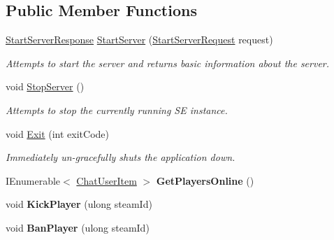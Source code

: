 \subsection*{Public Member Functions}
\begin{DoxyCompactItemize}
\item 
\hyperlink{class_s_e_comm_1_1_start_server_response}{Start\+Server\+Response} \hyperlink{interface_s_e_comm_1_1_i_server_service_a2df8b69afdb995c1d2ad7b5a39f59feb}{Start\+Server} (\hyperlink{class_s_e_comm_1_1_start_server_request}{Start\+Server\+Request} request)
\begin{DoxyCompactList}\small\item\em Attempts to start the server and returns basic information about the server. \end{DoxyCompactList}\item 
void \hyperlink{interface_s_e_comm_1_1_i_server_service_af0faa9bdfebe1514e6dec2a5d54aca94}{Stop\+Server} ()
\begin{DoxyCompactList}\small\item\em Attempts to stop the currently running S\+E instance. \end{DoxyCompactList}\item 
void \hyperlink{interface_s_e_comm_1_1_i_server_service_a3ac39f5e58c50a4c4bc92b576774f749}{Exit} (int exit\+Code)
\begin{DoxyCompactList}\small\item\em Immediately un-\/gracefully shuts the application down. \end{DoxyCompactList}\item 
\hypertarget{interface_s_e_comm_1_1_i_server_service_a1d0873cf58e433ee8434898cf92659bb}{}I\+Enumerable$<$ \hyperlink{class_s_e_mod_a_p_i_internal_1_1_chat_user_item}{Chat\+User\+Item} $>$ {\bfseries Get\+Players\+Online} ()\label{interface_s_e_comm_1_1_i_server_service_a1d0873cf58e433ee8434898cf92659bb}

\item 
\hypertarget{interface_s_e_comm_1_1_i_server_service_a8095aceeea7e5f7af615a6b033765648}{}void {\bfseries Kick\+Player} (ulong steam\+Id)\label{interface_s_e_comm_1_1_i_server_service_a8095aceeea7e5f7af615a6b033765648}

\item 
\hypertarget{interface_s_e_comm_1_1_i_server_service_ae18e13cf7f5475ee8ec6d698d6929993}{}void {\bfseries Ban\+Player} (ulong steam\+Id)\label{interface_s_e_comm_1_1_i_server_service_ae18e13cf7f5475ee8ec6d698d6929993}


\end{DoxyCompactItemize}
